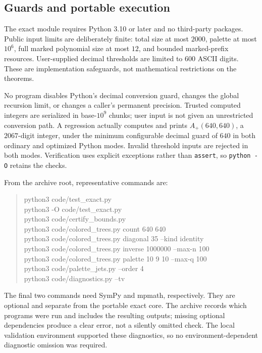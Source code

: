 \documentclass[11pt]{article}
\theoremstyle{definition}
\begin{document}
\subsection{Guards and portable execution}
The exact module requires Python 3.10 or later and no third-party packages. Public input limits are deliberately finite: total size at most $2000$, palette at most $10^6$, full marked polynomial size at most $12$, and bounded marked-prefix resources. User-supplied decimal thresholds are limited to $600$ ASCII digits. These are implementation safeguards, not mathematical restrictions on the theorems.

No program disables Python's decimal conversion guard, changes the global recursion limit, or changes a caller's permanent precision. Trusted computed integers are serialized in base-$10^9$ chunks; user input is not given an unrestricted conversion path. A regression actually computes and prints $A_+(640,640)$, a $2067$-digit integer, under the minimum configurable decimal guard of $640$ in both ordinary and optimized Python modes. Invalid threshold inputs are rejected in both modes. Verification uses explicit exceptions rather than \texttt{assert}, so \texttt{python -O} retains the checks.

From the archive root, representative commands are:
\begin{quote}\small\ttfamily
python3 code/test\_exact.py\\
python3 -O code/test\_exact.py\\
python3 code/certify\_bounds.py\\
python3 code/colored\_trees.py count 640 640\\
python3 code/colored\_trees.py diagonal 35 --kind identity\\
python3 code/colored\_trees.py inverse 1000000 --max-n 100\\
python3 code/colored\_trees.py palette 10 9 10 --max-q 100\\
python3 code/palette\_jets.py --order 4\\
python3 code/diagnostics.py --tv
\end{quote}
The final two commands need SymPy and mpmath, respectively. They are optional and separate from the portable exact core. The archive records which programs were run and includes the resulting outputs; missing optional dependencies produce a clear error, not a silently omitted check. The local validation environment supported these diagnostics, so no environment-dependent diagnostic omission was required.
\end{document}
